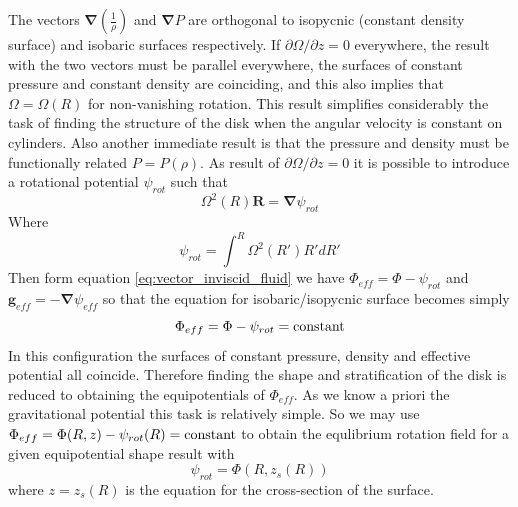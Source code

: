 \documentclass[a4paper,modern]{aastex62}
\renewcommand{\vec}[1]{\mathbf{#1}}
\begin{document}
The vectors $ \vec\nabla\left(\frac{1}{\rho}\right)$ and $\vec\nabla P$ are orthogonal to isopycnic (constant density surface) and isobaric surfaces respectively.
If $\partial \Omega/ \partial z=0$ everywhere, the result with the two vectors must be parallel everywhere, the surfaces of constant pressure and constant density are coinciding, and this also implies that $\Omega=\Omega(R)$ for non-vanishing rotation. This result simplifies considerably the task of finding the structure of the disk when the angular velocity is constant on cylinders. Also another immediate result is that the pressure and density must be functionally related $P=P(\rho)$.
As result of $\partial \Omega/ \partial z=0$ it is possible to introduce a rotational potential $\psi_{rot}$ such that
\begin{equation}
\Omega^2(R)\vec R = \vec \nabla \psi_{rot}
\end{equation}
Where 
\begin{equation}
\psi_{rot} = \int^R  \Omega^2(R') R' d R'
\end{equation}
Then form equation \ref{eq:vector_inviscid_fluid} we have $\Phi_{eff}=\Phi-\psi_{rot}$ and $\vec g_{eff} = -\vec \nabla \psi_{eff}$ so that the equation for isobaric/isopycnic surface becomes simply 
\begin{equation}\label{eq:phi_eff_constant}
\Phi_{eff}=\Phi-\psi_{rot}=\rm{constant}
\end{equation}
In this configuration the surfaces of constant pressure, density and effective potential all coincide. Therefore finding the shape and stratification of the disk is reduced to obtaining the equipotentials of $\Phi_{eff}$. As we know a priori the gravitational potential this task is relatively simple. So we may use $\Phi_{eff}=\Phi(R,z)-\psi_{rot}(R)=\rm{constant}$ to obtain the equlibrium rotation field for a given equipotential shape result with
\begin{equation}\label{eq:rotation_potantial}
    \psi_{rot}=\Phi(R,z_s(R))
\end{equation}
where $z=z_s(R)$ is the equation for the cross-section of the surface.
\end{document}

